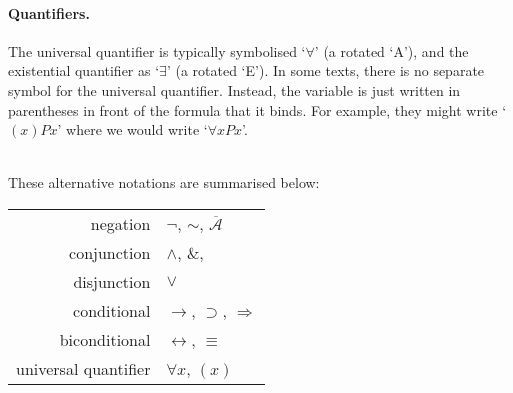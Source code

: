 \paragraph{Quantifiers.} The universal quantifier is typically symbolised `$\forall$' (a rotated `\textsf{A}'), and the existential quantifier as `$\exists$' (a rotated `\textsf{E}'). In some texts, there is no separate symbol for the universal quantifier. Instead, the variable is just written in parentheses in front of the formula that it binds. For example, they might write `$(x)Px$' where we would write `$\forall x Px$'.

\
\\These alternative notations are summarised below:

\begin{center}
\begin{tabular}{rl} \toprule 
negation & $\neg$, $∼$, $\overline{\mathscr{A}}$\\
conjunction & $\wedge$, $\&$, {\scriptsize\textbullet}\\
disjunction & $\vee$\\
conditional & $\rightarrow$, $\supset$, $\Rightarrow$\\
biconditional & $\leftrightarrow$, $\equiv$\\
universal quantifier & $\forall x$, $(x)$\\ \bottomrule
\end{tabular}
\end{center}


